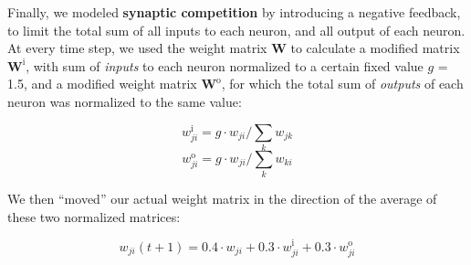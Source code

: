 \documentclass{article}
\begin{document}
Finally, we modeled \textbf{synaptic competition} by introducing a negative feedback, to limit the total sum of all inputs to each neuron, and all output of each neuron. At every time step, we used the weight matrix $\textbf{W}$ to calculate a modified matrix $\textbf{W}^\text{i}$, with sum of \textit{inputs} to each neuron normalized to a certain fixed value $g$ = 1.5, and a modified weight matrix $\textbf{W}^\text{o}$, for which the total sum of \textit{outputs} of each neuron was normalized to the same value: 

\[ w_{ji}^\text{i} = g \cdot w_{ji}/\sum_k{w_{jk}} \]
\[ w_{ji}^\text{o} = g \cdot w_{ji}/\sum_k{w_{ki}} \]

We then “moved” our actual weight matrix in the direction of the average of these two normalized matrices:

\[ w_{ji}(t+1) = 0.4 \cdot w_{ji} + 0.3 \cdot w^\text{i}_{ji} + 0.3 \cdot w^\text{o}_{ji} \]
\end{document}
